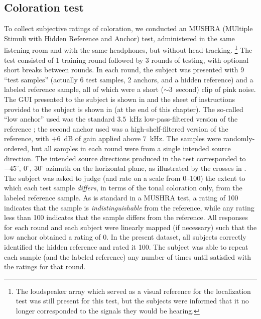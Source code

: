 \subsection{Coloration test}\label{sec:05_Proposed_Models:Coloration_Test}
To collect subjective ratings of coloration, we conducted an \citet{ITU-R-BS.1534-3} MUSHRA (MUltiple Stimuli with Hidden Reference and Anchor) test,
administered in the same listening room and with the same headphones, but without head-tracking.%
\footnote{The loudspeaker array which served as a visual reference for the localization test was still present for this test, but the subjects were informed that it no longer corresponded to the signals they would be hearing.}
The test consisted of 1 training round followed by 3 rounds of testing, with optional short breaks between rounds.
In each round, the subject was presented with 9 ``test samples'' (actually 6 test samples, 2 anchors, and a hidden reference) and a labeled reference sample, all of which were a short ($\sim3$~second) clip of pink noise.
The GUI presented to the subject is shown in  and the sheet of instructions provided to the subject is shown in  (at the end of this chapter).
The so-called ``low anchor'' used was the standard $3.5$~kHz low-pass-filtered version of the reference \citep{ITU-R-BS.1534-3}; the second anchor used was a high-shelf-filtered version of the reference, with $+6$~dB of gain applied above $7$~kHz.
The samples were randomly-ordered, but all samples in each round were from a single intended source direction.
The intended source directions produced in the test corresponded to $-45^\circ,~0^\circ,~30^\circ$ azimuth on the horizontal plane, as illustrated by the crosses in .
The subject was asked to judge (and rate on a scale from 0--100) the extent to which each test sample \textit{differs}, in terms of the tonal coloration only, from the labeled reference sample.
As is standard in a MUSHRA test, a rating of 100 indicates that the sample is \textit{indistinguishable} from the reference,
while any rating less than 100 indicates that the sample differs from the reference.
All responses for each round and each subject were linearly mapped (if necessary) such that the low anchor obtained a rating of 0.
In the present dataset, all subjects correctly identified the hidden reference and rated it 100.
The subject was able to repeat each sample (and the labeled reference) any number of times until satisfied with the ratings for that round.

